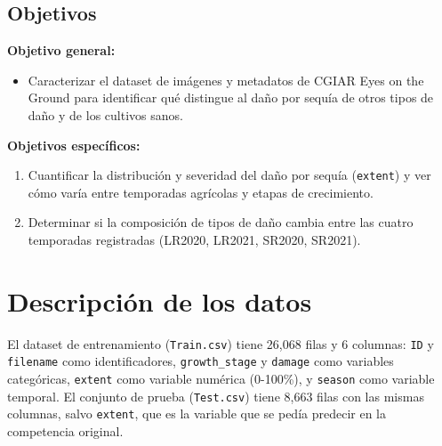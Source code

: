 \documentclass[11pt]{article}
\begin{document}
\subsection*{Objetivos}

\textbf{Objetivo general:}
\begin{itemize}[leftmargin=1.2cm]
    \item Caracterizar el dataset de imágenes y metadatos de CGIAR Eyes on the Ground para identificar qué distingue al daño por sequía de otros tipos de daño y de los cultivos sanos.
\end{itemize}

\textbf{Objetivos específicos:}
\begin{enumerate}[leftmargin=1.2cm]
    \item Cuantificar la distribución y severidad del daño por sequía (\texttt{extent}) y ver cómo varía entre temporadas agrícolas y etapas de crecimiento.
    \item Determinar si la composición de tipos de daño cambia entre las cuatro temporadas registradas (LR2020, LR2021, SR2020, SR2021).
\end{enumerate}

\section{Descripción de los datos}

El dataset de entrenamiento (\texttt{Train.csv}) tiene 26{,}068 filas y 6 columnas: \texttt{ID} y \texttt{filename} como identificadores, \texttt{growth\_stage} y \texttt{damage} como variables categóricas, \texttt{extent} como variable numérica (0-100\%), y \texttt{season} como variable temporal. El conjunto de prueba (\texttt{Test.csv}) tiene 8{,}663 filas con las mismas columnas, salvo \texttt{extent}, que es la variable que se pedía predecir en la competencia original.
\end{document}

